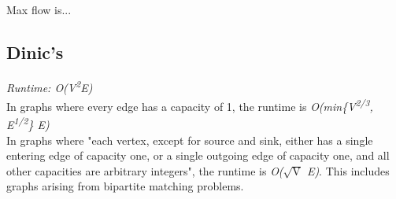 
Max flow is...

\subsection*{Dinic's}

\textit{Runtime: O(V\textsuperscript{2}E)} \\
\indent In graphs where every edge has a capacity of 1, the runtime is \textit{O(min\{V\textsuperscript{2/3}, E\textsuperscript{1/2}\} E)} \\
\indent In graphs where "each vertex, except for source and sink, either has a single entering edge of capacity one, or a single outgoing edge of capacity one, and all other capacities are arbitrary integers", the runtime is \textit{O($\sqrt{\text{V}}$ E)}. This includes graphs arising from bipartite matching problems.



\newpage